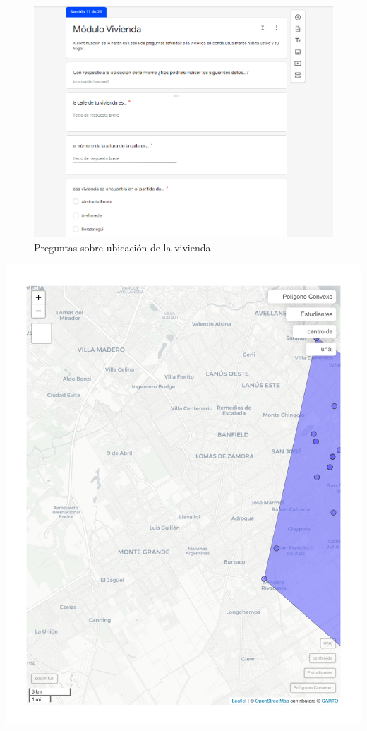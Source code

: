 \documentclass[
  letterpaper,
  DIV=11,
  numbers=noendperiod]{scrreprt}
\begin{document}
\begin{figure}

{\centering \includegraphics[width=6.25in,height=\textheight]{./Inputs/Images/pregunta_geo.png}

}

\caption{Preguntas sobre ubicación de la vivienda}

\end{figure}

\includegraphics{./geo_files/figure-pdf/geo_mapa-1.pdf}
\end{document}
